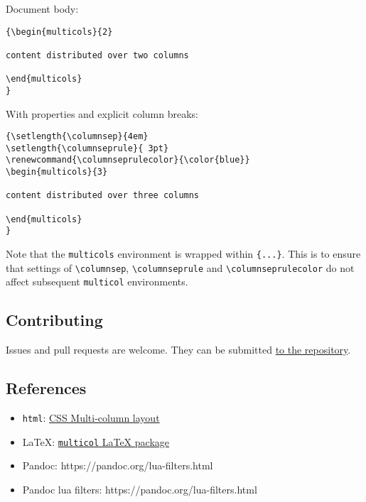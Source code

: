 \documentclass[
]{article}
\providecommand{\tightlist}{%
  \setlength{\itemsep}{0pt}\setlength{\parskip}{0pt}}
\begin{document}
Document body:

\begin{verbatim}
{\begin{multicols}{2}

content distributed over two columns

\end{multicols}
}
\end{verbatim}

With properties and explicit column breaks:

\begin{verbatim}
{\setlength{\columnsep}{4em}
\setlength{\columnseprule}{ 3pt}
\renewcommand{\columnseprulecolor}{\color{blue}}
\begin{multicols}{3}

content distributed over three columns

\end{multicols}
}
\end{verbatim}

Note that the \texttt{multicols} environment is wrapped within
\texttt{\{...\}}. This is to ensure that settings of
\texttt{\textbackslash{}columnsep},
\texttt{\textbackslash{}columnseprule} and
\texttt{\textbackslash{}columnseprulecolor} do not affect subsequent
\texttt{multicol} environments.

\hypertarget{contributing}{%
\subsection{Contributing}\label{contributing}}

Issues and pull requests are welcome. They can be submitted
\href{https://github.com/jdutant/columns}{to the repository}.

\hypertarget{references}{%
\subsection{References}\label{references}}

\begin{itemize}
\tightlist
\item
  \texttt{html}: \href{https://drafts.csswg.org/css-multicol}{CSS
  Multi-column layout}
\item
  LaTeX: \href{https://www.ctan.org/pkg/multicol}{\texttt{multicol}
  LaTeX package}
\item
  Pandoc: https://pandoc.org/lua-filters.html
\item
  Pandoc lua filters: https://pandoc.org/lua-filters.html
\end{itemize}
\end{document}
